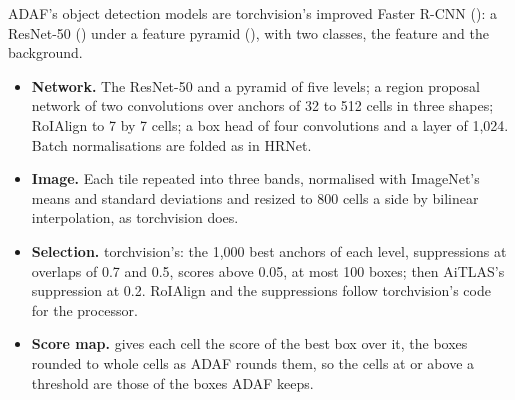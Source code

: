 ADAF's object detection models are torchvision's improved Faster R-CNN (): a ResNet-50 () under a feature pyramid
(), with two classes, the feature and the
background.
\begin{itemize}
\item \textbf{Network.} The ResNet-50 and a pyramid of five levels; a region proposal network of two convolutions over
  anchors of 32 to 512 cells in three shapes; RoIAlign to 7 by 7 cells; a box head of four convolutions and a layer of
  1,024. Batch normalisations are folded as in HRNet.
\item \textbf{Image.} Each tile repeated into three bands, normalised with ImageNet's means and standard deviations
  and resized to 800 cells a side by bilinear interpolation, as torchvision does.
\item \textbf{Selection.} torchvision's: the 1,000 best anchors of each level, suppressions at overlaps of 0.7 and
  0.5, scores above 0.05, at most 100 boxes; then AiTLAS's suppression at 0.2. RoIAlign and the suppressions follow
  torchvision's code for the processor.
\item \textbf{Score map.}  gives each cell the score of the best box over it, the boxes rounded
  to whole cells as ADAF rounds them, so the cells at or above a threshold are those of the boxes ADAF keeps.
\end{itemize}

